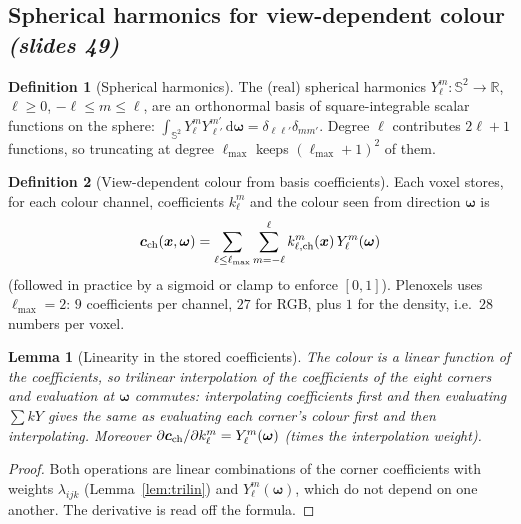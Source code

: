 \documentclass[11pt,a4paper]{article}
\newcommand{\R}{\mathbb{R}}
\newcommand{\xx}{\boldsymbol{x}}
\newcommand{\om}{\boldsymbol{\omega}}
\newcommand{\cc}{\boldsymbol{c}}
\newcommand{\dif}{\,\mathrm{d}}
\newcommand{\sref}[1]{\texorpdfstring{\emph{(slides #1)}}{(slides #1)}}
\theoremstyle{definition}
\newtheorem{definition}{Definition}[section]
\theoremstyle{plain}
\newtheorem{lemma}{Lemma}[section]
\begin{document}
\subsection{Spherical harmonics for view-dependent colour \sref{49}}

\begin{definition}[Spherical harmonics]
The (real) spherical harmonics $Y_\ell^m:\mathbb S^2\to\R$, $\ell\ge0$, $-\ell\le m\le\ell$, are an orthonormal basis of square-integrable scalar functions on the sphere: $\int_{\mathbb S^2}Y_\ell^mY_{\ell'}^{m'}\dif\om=\delta_{\ell\ell'}\delta_{mm'}$. Degree $\ell$ contributes $2\ell+1$ functions, so truncating at degree $\ell_{\max}$ keeps $(\ell_{\max}+1)^2$ of them.
\end{definition}

\begin{definition}[View-dependent colour from basis coefficients]
Each voxel stores, for each colour channel, coefficients $k_\ell^m$ and the colour seen from direction $\om$ is
\[
\cc_{\rm ch}(\xx,\om)=\sum_{\ell\le\ell_{\max}}\sum_{m=-\ell}^{\ell}k_{\ell,{\rm ch}}^m(\xx)\,Y_\ell^m(\om)
\]
(followed in practice by a sigmoid or clamp to enforce $[0,1]$). Plenoxels uses $\ell_{\max}=2$: $9$ coefficients per channel, $27$ for RGB, plus $1$ for the density, i.e.\ $28$ numbers per voxel.
\end{definition}

\begin{lemma}[Linearity in the stored coefficients]\label{lem:sh}
The colour is a linear function of the coefficients, so trilinear interpolation of the coefficients of the eight corners and evaluation at $\om$ commutes: interpolating coefficients first and then evaluating $\sum kY$ gives the same as evaluating each corner's colour first and then interpolating. Moreover $\partial\cc_{\rm ch}/\partial k_\ell^m=Y_\ell^m(\om)$ (times the interpolation weight).
\end{lemma}
\begin{proof}
Both operations are linear combinations of the corner coefficients with weights $\lambda_{ijk}$ (Lemma~\ref{lem:trilin}) and $Y_\ell^m(\om)$, which do not depend on one another. The derivative is read off the formula.
\end{proof}
\end{document}

